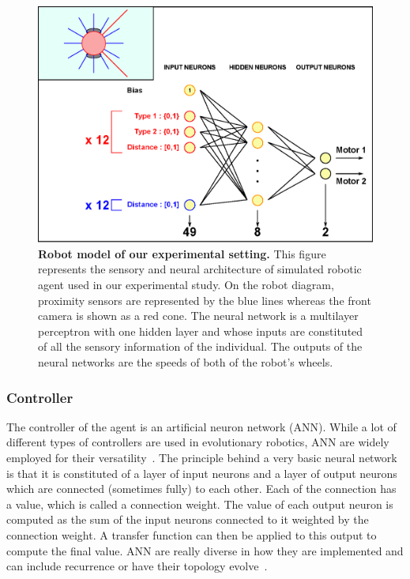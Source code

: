     \begin{figure}[hbt]
        \begin{center}
          \includegraphics[scale = 0.60]{fig/Intro/RobotModel.eps}
          \caption{\textbf{Robot model of our experimental setting.}
          This figure represents the sensory and neural architecture of simulated robotic agent used in our experimental study. On the robot diagram, proximity sensors are represented by the blue lines whereas the front camera is shown as a red cone. The neural network is a multilayer perceptron with one hidden layer and whose inputs are constituted of all the sensory information of the individual. The outputs of the neural networks are the speeds of both of the robot's wheels.} 
          \label{fig:RobotModel}
        \end{center}
    \end{figure}

    \subsubsection{Controller} The controller of the agent is an artificial neuron network (ANN). While a lot of different types of controllers are used in evolutionary robotics, ANN are widely employed for their versatility~\parencite{Doncieux2015a}. The principle behind a very basic neural network is that it is constituted of a layer of input neurons and a layer of output neurons which are connected (sometimes fully) to each other. Each of the connection has a value, which is called a connection weight. The value of each output neuron is computed as the sum of the input neurons connected to it weighted by the connection weight. A transfer function can then be applied to this output to compute the final value. ANN are really diverse in how they are implemented and can include recurrence or have their topology evolve~\parencite{Stanley2002}.

